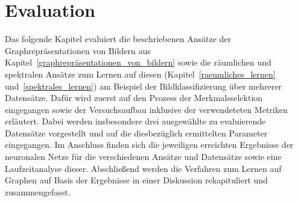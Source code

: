 \chapter{Evaluation}
\label{evaluation}

Das folgende Kapitel evaluiert die beschriebenen Ansätze der Graphrepräsentationen von Bildern aus Kapitel~\ref{graphrepräsentationen_von_bildern} sowie die räumlichen und spektralen Ansätze zum Lernen auf diesen (Kapitel~\ref{raeumliches_lernen} und~\ref{spektrales_lernen}) am Beispiel der Bildklassifizierung über mehrerer Datensätze.
Dafür wird zuerst auf den Prozess der Merkmalsselektion eingegangen sowie der Versuchsaufbau inklusive der verwendeteten Metriken erläutert.
Dabei werden insbesondere drei ausgewählte zu evaluierende Datensätze vorgestellt und auf die diesbezüglich ermittelten Parameter eingegangen.
Im Anschluss finden sich die jeweiligen erreichten Ergebnisse der neuronalen Netze für die verschiedenen Ansätze und Datensätze sowie eine Laufzeitanalyse dieser.
Abschließend werden die Verfahren zum Lernen auf Graphen auf Basis der Ergebnisse in einer Diskussion rekapituliert und zusammengefasst.






